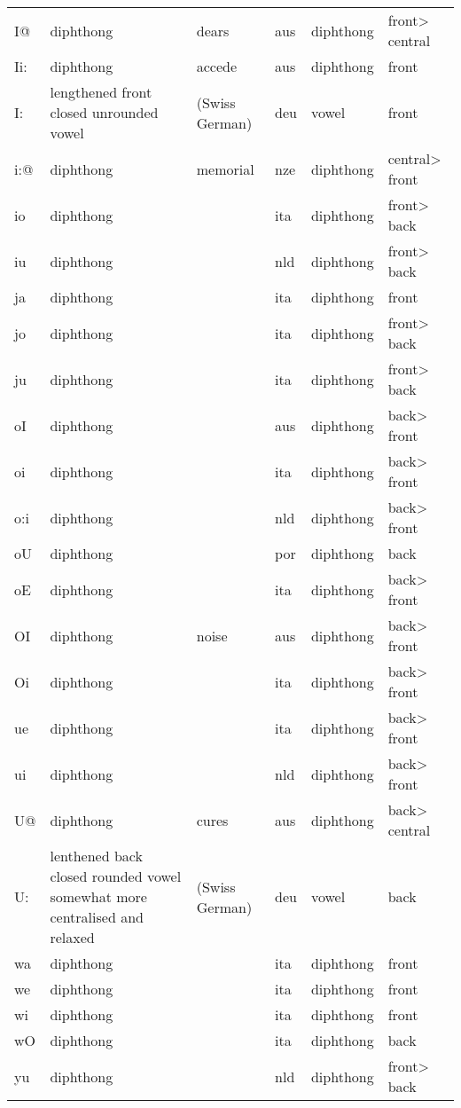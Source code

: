 {\begin{longtable}{l|p{.3\linewidth}|p{.15\linewidth}|l|p{.15\linewidth}|l}
	I@	& diphthong	& dears	& aus	& diphthong	& front\textgreater{} central	\\
	Ii:	& diphthong	& accede	& aus	& diphthong	& front	\\
	I:\	& lengthened front closed unrounded vowel	& (Swiss German)	& deu	& vowel	& front	\\
	i:@	& diphthong	& memorial	& nze	& diphthong	& central\textgreater{} front	\\
	io	& diphthong	& 	& ita	& diphthong	& front\textgreater{} back	\\
	iu	& diphthong	& 	& nld	& diphthong	& front\textgreater{} back	\\
	ja	& diphthong	& 	& ita	& diphthong	& front	\\
	jo	& diphthong	& 	& ita	& diphthong	& front\textgreater{} back	\\
	ju	& diphthong	& 	& ita	& diphthong	& front\textgreater{} back	\\
	oI	& diphthong	& 	& aus	& diphthong	& back\textgreater{} front	\\
	oi	& diphthong	& 	& ita	& diphthong	& back\textgreater{} front	\\
	o:i	& diphthong	& 	& nld	& diphthong	& back\textgreater{} front	\\
	oU	& diphthong	& 	& por	& diphthong	& back	\\
	oE	& diphthong	& 	& ita	& diphthong	& back\textgreater{} front	\\
	OI	& diphthong	& noise	& aus	& diphthong	& back\textgreater{} front	\\
	Oi	& diphthong	& 	& ita	& diphthong	& back\textgreater{} front	\\
	ue	& diphthong	& 	& ita	& diphthong	& back\textgreater{} front	\\
	ui	& diphthong	& 	& nld	& diphthong	& back\textgreater{} front	\\
	U@	& diphthong	& cures	& aus	& diphthong	& back\textgreater{} central	\\
	U:\	& lenthened back closed rounded vowel somewhat more centralised and relaxed	& (Swiss German)	& deu	& vowel	& back	\\
	wa	& diphthong	& 	& ita	& diphthong	& front	\\
	we	& diphthong	& 	& ita	& diphthong	& front	\\
	wi	& diphthong	& 	& ita	& diphthong	& front	\\
	wO	& diphthong	& 	& ita	& diphthong	& back	\\
	yu	& diphthong	& 	& nld	& diphthong	& front\textgreater{} back	\\

\end{longtable}}
